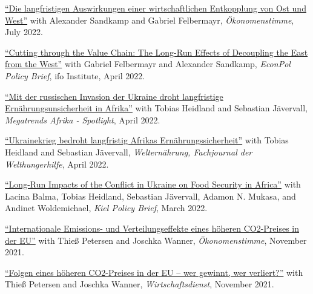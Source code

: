 \documentclass{article}
\newlength{\cvlabelwidth}\setlength{\cvlabelwidth}{0.12\textwidth}
\newlength{\cvlabelgap}\setlength{\cvlabelgap}{5mm}
\newcommand{\cvmakelabel}[1]{%
    \smash{\parbox[t]{\cvlabelwidth}{\raggedright{\fontfamily{phv}\selectfont #1}}}}
\newenvironment{cvsection}[1]{%
    \par\medskip
    \begin{list}{}{%
        \setlength{\leftmargin}{\dimexpr\cvlabelwidth+\cvlabelgap\relax}%
        \setlength{\labelwidth}{\cvlabelwidth}%
        \setlength{\labelsep}{\cvlabelgap}%
        \setlength{\rightmargin}{0pt}%
        \setlength{\itemindent}{0pt}%
        \setlength{\listparindent}{0pt}%
        \setlength{\topsep}{0pt}%
        \setlength{\partopsep}{0pt}%
        \setlength{\parsep}{0.3em}%
        \setlength{\itemsep}{0pt}%
        \let\makelabel\cvmakelabel%
    }%
    \item[#1]\ignorespaces%
}{%
    \end{list}\medskip%
}
\begin{document}
\begin{cvsection}{COMMENTARY \& POLICY REPORTS}
    \href{https://www.oekonomenstimme.org/artikel/2022/07/die-langfristigen-auswirkungen-einer-wirtschaftlichen-entkopplung-von-ost-und-west/}{``Die langfristigen Auswirkungen einer wirtschaftlichen Entkopplung von Ost und West''} with Alexander Sandkamp and Gabriel Felbermayr, \textit{Ökonomenstimme}, July 2022. \par
    \href{https://www.cesifo.org/en/publikationen/2022/working-paper/cutting-through-value-chain-long-run-effects-decoupling-east-west}{``Cutting through the Value Chain: The Long-Run Effects of Decoupling the East from the West''} with Gabriel Felbermayr and Alexander Sandkamp, \textit{EconPol Policy Brief}, ifo Institute, April 2022. \par
    \href{https://www.megatrends-afrika.de/publikation/mit-der-russischen-invasion-der-ukraine-droht-langfristige-ernaehrungsunsicherheit-in-afrika}{``Mit der russischen Invasion der Ukraine droht langfristige Ernährungsunsicherheit in Afrika''} with Tobias Heidland and Sebastian Jävervall, \textit{Megatrends Afrika - Spotlight}, April 2022. \par

    \href{https://www.welthungerhilfe.de/welternaehrung/rubriken/agrar-ernaehrungspolitik/wie-der-ukrainekrieg-afrikas-brotversorgung-trifft/}{``Ukrainekrieg bedroht langfristig Afrikas Ernährungssicherheit''} with Tobias Heidland and Sebastian Jävervall, \textit{Welternährung, Fachjournal der Welthungerhilfe}, April 2022. \par
    \href{https://www.ifw-kiel.de/publications/kiel-policy-brief/ukraine-special/long-run-impacts-of-the-conflict-in-ukraine-on-food-security-in-africa-17165/}{``Long-Run Impacts of the Conflict in Ukraine on Food Security in Africa''} with Lacina Balma, Tobias Heidland, Sebastian Jävervall, Adamon N. Mukasa, and Andinet Woldemichael, \textit{Kiel Policy Brief}, March 2022. \par
    

    \href{https://www.oekonomenstimme.org/artikel/2021/11/internationale-emissions--und-verteilungseffekte-eines-hoeheren-co2-preises-in-der-eu/}{``Internationale Emissions- und Verteilungseffekte eines höheren CO2-Preises in der EU''} with Thieß Petersen and Joschka Wanner, \textit{Ökonomenstimme}, November 2021. \par
\href{https://www.wirtschaftsdienst.eu/inhalt/jahr/2021/heft/11/beitrag/folgen-eines-hoeheren-co2-preises-in-der-eu-wer-gewinnt-wer-verliert.html}{``Folgen eines höheren CO2-Preises in der EU – wer gewinnt, wer verliert?''} with Thieß Petersen and Joschka Wanner, \textit{Wirtschaftsdienst}, November 2021. \par


\end{cvsection}
\end{document}

